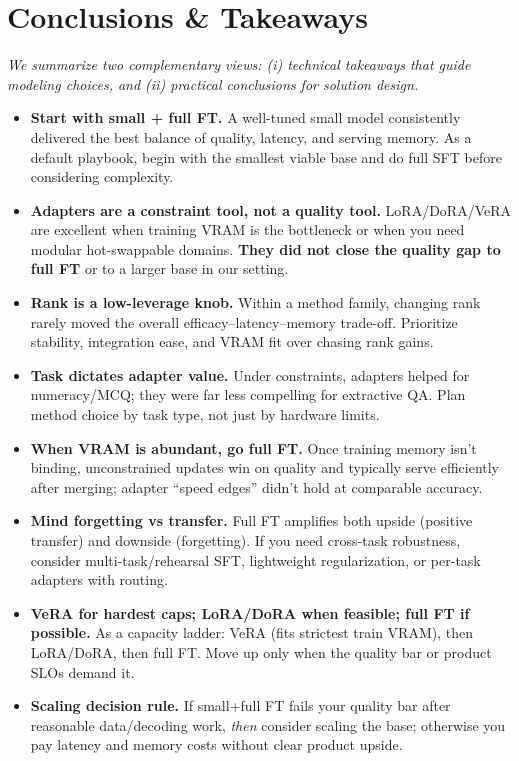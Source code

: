\documentclass[11pt,a4paper]{article}
\begin{document}
\section{Conclusions \& Takeaways}

\textit{We summarize two complementary views: (i) technical takeaways that guide modeling choices, and (ii) practical conclusions for solution design.}


\begin{itemize}
  \item \textbf{Start with small + full FT.} A well-tuned small model consistently delivered the best balance of quality, latency, and serving memory. As a default playbook, begin with the smallest viable base and do full SFT before considering complexity.

  \item \textbf{Adapters are a constraint tool, not a quality tool.} LoRA/DoRA/VeRA are excellent when training VRAM is the bottleneck or when you need modular hot-swappable domains. \textbf{They did not close the quality gap to full FT} or to a larger base in our setting.

  \item \textbf{Rank is a low-leverage knob.} Within a method family, changing rank rarely moved the overall efficacy–latency–memory trade-off. Prioritize stability, integration ease, and VRAM fit over chasing rank gains.

  \item \textbf{Task dictates adapter value.} Under constraints, adapters helped for numeracy/MCQ; they were far less compelling for extractive QA. Plan method choice by task type, not just by hardware limits.

  \item \textbf{When VRAM is abundant, go full FT.} Once training memory isn’t binding, unconstrained updates win on quality and typically serve efficiently after merging; adapter “speed edges” didn’t hold at comparable accuracy.

  \item \textbf{Mind forgetting vs transfer.} Full FT amplifies both upside (positive transfer) and downside (forgetting). If you need cross-task robustness, consider multi-task/rehearsal SFT, lightweight regularization, or per-task adapters with routing.

  \item \textbf{VeRA for hardest caps; LoRA/DoRA when feasible; full FT if possible.} As a capacity ladder: VeRA (fits strictest train VRAM), then LoRA/DoRA, then full FT. Move up only when the quality bar or product SLOs demand it.

  \item \textbf{Scaling decision rule.} If small+full FT fails your quality bar after reasonable data/decoding work, \emph{then} consider scaling the base; otherwise you pay latency and memory costs without clear product upside.
\end{itemize}
\end{document}
